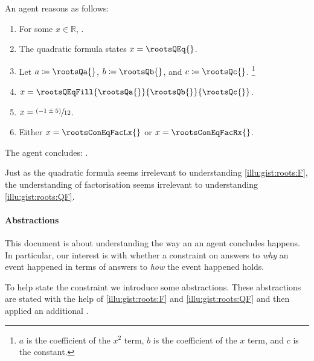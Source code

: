 \begin{note}
  \begin{scenario}%
    \label{illu:gist:roots:QF}%
    An agent reasons as follows:
    \begin{enumerate}[label=\arabic*., ref=\arabic*]
    \item
      \label{illu:gist:roots:QF:eq}
      For some \(x \in \mathbb{R}\), \rootsConEq{}.
    \item
      \label{illu:gist:roots:QF:qf}
      The quadratic formula states \(x = \rootsQEq{}\).
    \item
      \label{illu:gist:roots:QF:subs}
      Let \(a \coloneq \rootsQa{}\), \(b \coloneq \rootsQb{}\), and \(c \coloneq \rootsQc{}\).%
      \footnote{
        \(a\) is the coefficient of the \(x^{2}\) term, \(b\) is the coefficient of the \(x\) term, and \(c\) is the constant.
      }
    \item
      \label{illu:gist:roots:QF:qf-subs}
      \(x = \rootsQEqFill{\rootsQa{}}{\rootsQb{}}{\rootsQc{}}\).
    \item
      \label{illu:gist:roots:QF:qf:1}
      \(x = \sfrac{(- 1 \pm 5)}{12}\).
    \item
      \label{illu:gist:roots:QF:qf:done}
      Either \(x = \rootsConEqFacLx{}\) or \(x = \rootsConEqFacRx{}\).
    \end{enumerate}
    The agent concludes:
    \rootsCon{}.
  \end{scenario}

  \noindent%
  Just as the quadratic formula seems irrelevant to understanding \autoref{illu:gist:roots:F}, the \agents{} understanding of factorisation seems irrelevant to understanding \autoref{illu:gist:roots:QF}.
\end{note}



\paragraph*{Abstractions}


\begin{note}
  This document is about understanding the way an  an agent concludes happens.
  In particular, our interest is with whether a constraint on answers to \emph{why} an event happened in terms of answers to \emph{how} the event happened holds.

  To help state the constraint we introduce some abstractions.
  These abstractions are stated with the help of  \ref{illu:gist:roots:F} and \ref{illu:gist:roots:QF} and then applied an additional \scen{}.
\end{note}


